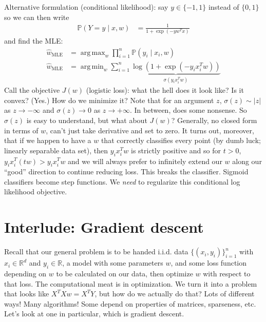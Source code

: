 \documentclass[11pt,letterpaper]{article}
\DeclareMathOperator*{\argmin}{arg\,min}
\DeclareMathOperator*{\argmax}{arg\,max}
\theoremstyle{definition}
\numberwithin{equation}{section}
\numberwithin{figure}{section}
\begin{document}
Alternative formulation (conditional likelihood): say $y \in \{-1,1\}$ instead of $\{0,1\}$ so we can then write
%
\begin{align}
	\mathbb{P}(Y=y \mid x,w) &= \frac{1}{1+\exp\left(-y w^T x\right)}
\end{align}
%
and find the MLE:
%
\begin{align}
	\hat{w}_\mathrm{MLE} &= \argmax_w \prod_{i=1}^n \mathbb{P}(y_i \mid x_i,w)\\
	\hat{w}_\mathrm{MLE} &= \argmin_w \sum_{i=1}^n \underbrace{\log\left(1+ \exp\left(-y_i x_i^T w\right) \right)}_{\sigma(y_i x_i^T w)}
\end{align}
%
Call the objective $J(w)$ (logistic loss): what the hell does it look like? Is it convex? (Yes.) How do we minimize it? Note that for an argument $z$, $\sigma(z) \sim |z|$ as $z \to -\infty$ and $\sigma(z) \to 0$ as $z \to +\infty$. In between, does some nonsense. So $\sigma(z)$ is easy to understand, but what about $J(w)$? Generally, no closed form in terms of $w$, can't just take derivative and set to zero. It turns out, moreover, that if we happen to have a $w$ that correctly classifies every point (by dumb luck; linearly separable data set), then $y_i x_i^T w$ is strictly positive and so for $t > 0$, $y_i x_i^T (tw) > y_i x_i^T w$ and we will always prefer to infinitely extend our $w$ along our ``good'' direction to continue reducing loss. This breaks the classifier. Sigmoid classifiers become step functions. We \emph{need} to regularize this conditional log likelihood objective.













\section{Interlude: Gradient descent}
Recall that our general problem is to be handed i.i.d. data $\{(x_i,y_i)\}_{i=1}^n$ with $x_i \in \mathbb{R}^d$ and $y_i \in \mathbb{R}$, a model with some parameters $w$, and some loss function depending on $w$ to be calculated on our data, then optimize $w$ with respect to that loss. The computational meat is in optimization. We turn it into a problem that looks like $X^T X w = X^T Y$, but how do we actually do that? Lots of different ways! Many algorithms! Some depend on properties of matrices, sparseness, etc. Let's look at one in particular, which is gradient descent.
\end{document}
